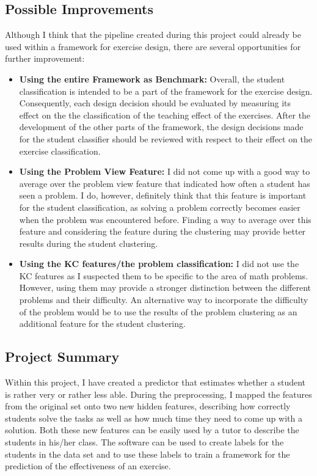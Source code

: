 \subsection{Possible Improvements}
Although I think that the pipeline created during this project could already be used within a framework for exercise design, there are several opportunities for further improvement:

\begin{itemize}
	\item \textbf{Using the entire Framework as Benchmark:} Overall, the student classification is intended to be a part of the framework for the exercise design. Consequently, each design decision should be evaluated by measuring its effect on the the classification of the teaching effect of the exercises. After the development of the other parts of the framework, the design decisions made for the student classifier should be reviewed with respect to their effect on the exercise classification.
	\item \textbf{Using the Problem View Feature:} I did not come up with a good way to average over the problem view feature that indicated how often a student has seen a problem. I do, however, definitely think that this feature is important for the student classification, as solving a problem correctly becomes easier when the problem was encountered before. Finding a way to average over this feature and considering the feature during the clustering may provide better results during the student clustering. 
	\item \textbf{Using the KC features/the problem classification:} I did not use the KC features as I suspected them to be specific to the area of math problems. However, using them may provide a stronger distinction between the different problems and their difficulty. An alternative way to incorporate the difficulty of the problem would be to use the results of the problem clustering as an additional feature for the student clustering.
\end{itemize}


\subsection{Project Summary}
Within this project, I have created a predictor that estimates whether a student is rather very or rather less able. During the preprocessing, I mapped the features from the original set onto two new hidden features, describing how correctly students solve the tasks as well as how much time they need to come up with a solution. Both these new features can be easily used by a tutor to describe the students in his/her class. The software can be used to create labels for the students in the data set and to use these labels to train a framework for the prediction of the effectiveness of an exercise.  